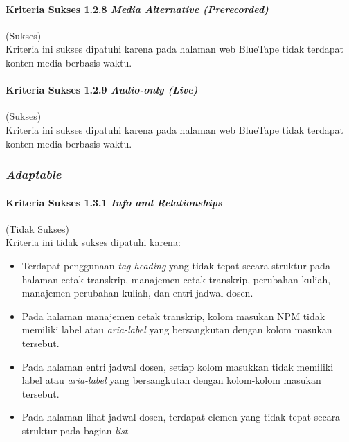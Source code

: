 \paragraph{Kriteria Sukses 1.2.8 \textit{Media Alternative (Prerecorded)}}
\label{par:kepatuhan_bluetape_kriteria_sukses_1.2.8}
(Sukses)\\

Kriteria ini sukses dipatuhi karena pada halaman web BlueTape tidak terdapat konten media berbasis waktu.

\paragraph{Kriteria Sukses 1.2.9 \textit{Audio-only (Live)}}
\label{par:kepatuhan_bluetape_kriteria_sukses_1.2.9}
(Sukses)\\

Kriteria ini sukses dipatuhi karena pada halaman web BlueTape tidak terdapat konten media berbasis waktu.

\subsubsection{\textit{Adaptable}}
\label{subsubsec:kepatuhan_bluetape_adaptable}

\paragraph{Kriteria Sukses 1.3.1 \textit{Info and Relationships}}
\label{par:kepatuhan_bluetape_kriteria_sukses_1.3.1}
(Tidak Sukses)\\

Kriteria ini tidak sukses dipatuhi karena:
\begin{itemize}
    \item Terdapat penggunaan \textit{tag heading} yang tidak tepat secara struktur pada halaman cetak transkrip, manajemen cetak transkrip, perubahan kuliah, manajemen perubahan kuliah, dan entri jadwal dosen.
    \item Pada halaman manajemen cetak transkrip, kolom masukan NPM tidak memiliki label atau \textit{aria-label} yang bersangkutan dengan kolom masukan tersebut.
    \item Pada halaman entri jadwal dosen, setiap kolom masukkan tidak memiliki label atau \textit{aria-label} yang bersangkutan dengan kolom-kolom masukan tersebut.
    \item Pada halaman lihat jadwal dosen, terdapat elemen yang tidak tepat secara struktur pada bagian \textit{list}.
\end{itemize} 

